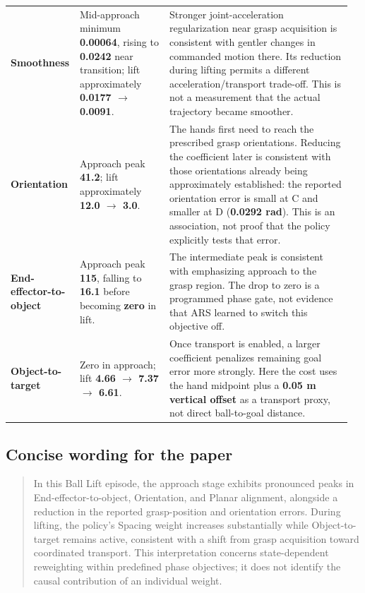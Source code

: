 \documentclass[11pt,a4paper]{article}
\begin{document}
\begin{longtable}{@{}p{0.17\linewidth}p{0.26\linewidth}p{0.53\linewidth}@{}}
\textbf{Smoothness} & Mid-approach minimum \textbf{0.00064}, rising to \textbf{0.0242} near transition; lift approximately \textbf{0.0177 \(\rightarrow\) 0.0091}. & Stronger joint-acceleration regularization near grasp acquisition is consistent with gentler changes in commanded motion there. Its reduction during lifting permits a different acceleration/transport trade-off. This is not a measurement that the actual trajectory became smoother. \\
\textbf{Orientation} & Approach peak \textbf{41.2}; lift approximately \textbf{12.0 \(\rightarrow\) 3.0}. & The hands first need to reach the prescribed grasp orientations. Reducing the coefficient later is consistent with those orientations already being approximately established: the reported orientation error is small at C and smaller at D (\textbf{0.0292 rad}). This is an association, not proof that the policy explicitly tests that error. \\
\textbf{End-effector-to-object} & Approach peak \textbf{115}, falling to \textbf{16.1} before becoming \textbf{zero} in lift. & The intermediate peak is consistent with emphasizing approach to the grasp region. The drop to zero is a programmed phase gate, not evidence that ARS learned to switch this objective off. \\
\textbf{Object-to-target} & Zero in approach; lift \textbf{4.66 \(\rightarrow\) 7.37 \(\rightarrow\) 6.61}. & Once transport is enabled, a larger coefficient penalizes remaining goal error more strongly. Here the cost uses the hand midpoint plus a \textbf{0.05 m vertical offset} as a transport proxy, not direct ball-to-goal distance. \\
\end{longtable}
\endgroup

\subsection{Concise wording for the paper}

\begin{quote}
In this Ball Lift episode, the approach stage exhibits pronounced peaks in End-effector-to-object, Orientation, and Planar alignment, alongside a reduction in the reported grasp-position and orientation errors. During lifting, the policy's Spacing weight increases substantially while Object-to-target remains active, consistent with a shift from grasp acquisition toward coordinated transport. This interpretation concerns state-dependent reweighting within predefined phase objectives; it does not identify the causal contribution of an individual weight.
\end{quote}
\end{document}
